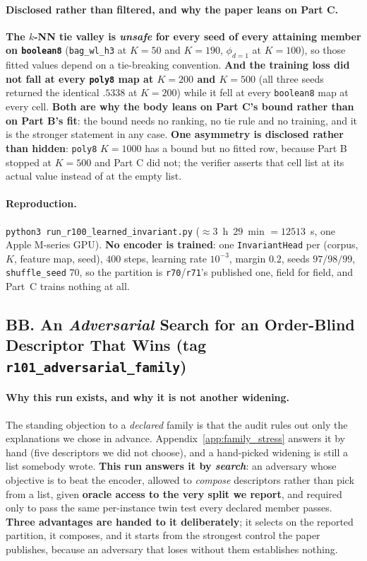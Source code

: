 \paragraph{Disclosed rather than filtered, and why the paper leans on Part C.} \textbf{The $k$-NN tie valley is \emph{unsafe} for every seed of every attaining member on \texttt{boolean8}} (\texttt{bag\_wl\_h3} at $K{=}50$ and $K{=}190$, $\phi_{d=1}$ at $K{=}100$), so those fitted values depend on a tie-breaking convention. \textbf{And the training loss did not fall at every \texttt{poly8} map at $K{=}200$ and $K{=}500$} (all three seeds returned the identical $.5338$ at $K{=}200$) while it fell at every \texttt{boolean8} map at every cell. \textbf{Both are why the body leans on Part C's bound rather than on Part B's fit}: the bound needs no ranking, no tie rule and no training, and it is the stronger statement in any case. \textbf{One asymmetry is disclosed rather than hidden}: \texttt{poly8} $K{=}1000$ has a bound but no fitted row, because Part B stopped at $K{=}500$ and Part C did not; the verifier asserts that cell list at its actual value instead of at the empty list.

\paragraph{Reproduction.} \texttt{python3 run\_r100\_learned\_invariant.py} ($\approx3$~h~$29$~min $= 12513$~s, one Apple M-series GPU). \textbf{No encoder is trained}: one \texttt{InvariantHead} per (corpus, $K$, feature map, seed), $400$ steps, learning rate $10^{-3}$, margin $0.2$, seeds $97/98/99$, \texttt{shuffle\_seed} $70$, so the partition is \texttt{r70}/\texttt{r71}'s published one, field for field, and Part~C trains nothing at all.

\subsection*{BB. An \emph{Adversarial} Search for an Order-Blind Descriptor That Wins (tag \texttt{r101\_adversarial\_family})}

\paragraph{Why this run exists, and why it is not another widening.} The standing objection to a \emph{declared} family is that the audit rules out only the explanations we chose in advance. Appendix~\ref{app:family_stress} answers it by hand (five descriptors we did not choose), and a hand-picked widening is still a list somebody wrote. \textbf{This run answers it by \emph{search}}: an adversary whose objective is to beat the encoder, allowed to \emph{compose} descriptors rather than pick from a list, given \textbf{oracle access to the very split we report}, and required only to pass the same per-instance twin test every declared member passes. \textbf{Three advantages are handed to it deliberately}; it selects on the reported partition, it composes, and it starts from the strongest control the paper publishes, because an adversary that loses without them establishes nothing.

